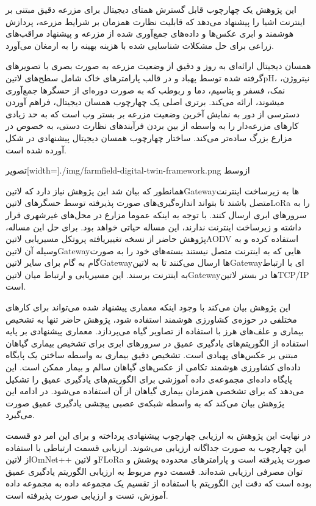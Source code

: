 این پژوهش یک چهارچوب قابل گسترش همتای دیجیتال برای مزرعه دقیق مبتنی بر اینترنت اشیا را پیشنهاد می‌دهد که قابلیت نظارت همزمان بر شرایط مزرعه،
پردازش هوشمند و ابری عکس‌ها و داده‌های جمع‌آوری شده از مزرعه و پیشنهاد مراقب‌های زراعی برای حل مشکلات شناسایی شده با هزینه بهینه را به ارمغان
می‌آورد.

همسان دیجیتال ارائه‌‌ای به روز و دقیق از وضعیت مزرعه به صورت بصری با تصویرهای گرفته شده توسط پهباد و در قالب پارامترهای خاک شامل سطح‌های ‌لاتین{pH}،
نیتروژن، نمک، فسفر و پتاسیم، دما و ربوطب که به صورت دوره‌ای از حسگرها جمع‌آوری میشوند، ارائه می‌کند.
برتری اصلی یک چهارچوب همسان دیجیتال، فراهم آوردن دسترسی از دور به نمایش آخرین وضعیت مزرعه بر بستر وب است که به حد زیادی کارهای مزرعه‌دار را
به واسطه از بین بردن فرآیندهای نظارت دستی، به خصوص در مزارع بزرگ ساده‌تر می‌کند.
ساختار چهارچوب همسان دیجیتال پیشنهادی در شکل  آورده شده است.

‌تصویر[width=\textwidth]{./img/farmfield-digital-twin-framework.png}
‌ازوسط

همانطور که بیان شد این پژوهش نیاز دارد که ‌لاتین{Gateway}ها به زیرساخت اینترنت متصل باشند تا بتواند اندازه‌گیری‌های صورت پذیرفته توسط حسگرهای ‌لاتین{LoRa} را
به سرورهای ابری ارسال کنند. با توجه به اینکه عموما مزارع در محل‌های غیرشهری قرار داشته و زیرساخت اینترنت ندارند، این مساله حیاتی خواهد بود.
برای حل این مساله، پژوهش حاضر از نسخه تغییریافته پروتکل مسیریابی ‌لاتین{AODV} استفاده کرده و به وسیله آن ‌لاتین{Gateway}هایی که به اینترنت متصل نیستند بسته‌های خود
را به صورت گام به گام برای سایر ‌لاتین{Gateway}ها ارسال می‌کنند تا به ‌لاتین{Gateway}ای با ارتباط به اینترنت برسند.
این مسیریابی و ارتباط میان ‌لاتین{Gateway}ها در بستر ‌لاتین{TCP/IP} است.

این پژوهش بیان می‌کند با وجود اینکه معماری پیشنهاد شده می‌تواند برای کارهای مختلفی در حوزه‌ی کشاورزی هوشمند استفاده شود، پژوهش حاضر تنها به تشخیص بیماری و علف‌های هرز
با استفاده از تصاویر گیاه می‌پردازد.
معماری پیشنهادی بر پایه استفاده از الگوریتم‌های یادگیری عمیق در سرورهای ابری برای تشخیص بیماری گیاهان مبتنی بر عکس‌های پهبادی است.
تشخیص دقیق بیماری به واسطه ساختن یک پایگاه داده‌ای کشاورزی هوشمند تکامی از عکس‌های گیاهان سالم و بیمار ممکن است.
این پایگاه داده‌ای مجموعه‌ی داده‌ آموزشی برای الگوریتم‌های یادگیری عمیق را تشکیل می‌دهد که برای تشخصی همزمان بیماری گیاهان از آن استفاده می‌شود.
در ادامه این پژوهش بیان می‌کند که به واسطه شبکه‌ی عصبی پیچشی یادگیری عمیق صورت می‌گیرد.

در نهایت این پژوهش به ارزیابی چهارچوب پیشنهادی پرداخته و برای این امر دو قسمت این چهارچوب به صورت جداگانه ارزیابی می‌شوند.
ارزیابی قسمت ارتباطی با استفاده از ‌لاتین{OmNet++} و ‌لاتین{FLoRa} صورت پذیرفته است و پارامترهای محدوده پوشش و توان مصرفی ارزیابی شده‌اند.
قسمت دوم مربوط به ارزیابی الگوریتم یادگیری عمیق بوده است که دقت این الگوریتم با استفاده از تقسیم یک مجموعه داده به مجموعه داده آموزش، تست و ارزیابی
صورت پذیرفته است.
